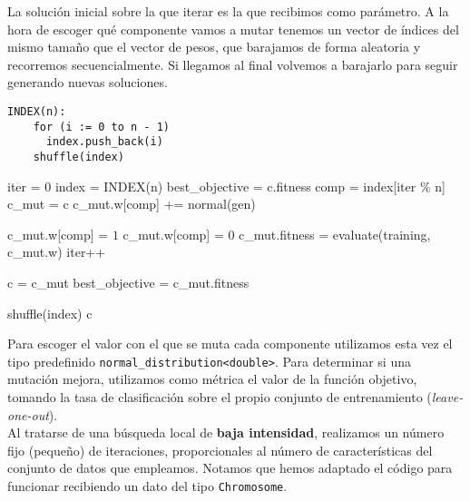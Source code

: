 \documentclass[12pt]{article}
\begin{document}
La solución inicial sobre la que iterar es la que recibimos como parámetro. A la hora de escoger qué componente vamos a mutar tenemos un vector de índices del mismo tamaño que el vector de pesos, que barajamos de forma aleatoria y recorremos secuencialmente. Si llegamos al final volvemos a barajarlo para seguir generando nuevas soluciones.

\begin{verbatim}
INDEX(n):
    for (i := 0 to n - 1)
      index.push_back(i)
    shuffle(index)
\end{verbatim}

\begin{algorithm}[h!]
\begin{algorithmic}

    \State iter = 0
    \State index = INDEX(n) 
    \State best\_objective = c.fitness
        \State comp = index[iter $\%$ n]
        \State c\_mut = c
        \State c\_mut.w[comp] += normal(gen)
        
         \State c\_mut.w[comp] = $1$
         \State c\_mut.w[comp] = $0$
        \EndIf
        \State c\_mut.fitness = evaluate(training, c\_mut.w)
        \State iter++

          \State c = c\_mut
          \State best\_objective = c\_mut.fitness
        \EndIf

          \State shuffle(index)
        \EndIf
     \EndWhile
\State \Return c
\EndFunction

\end{algorithmic}
\end{algorithm}

Para escoger el valor con el que se muta cada componente utilizamos esta vez el tipo predefinido \verb|normal_distribution<double>|. Para determinar si una mutación mejora, utilizamos como métrica el valor de la función objetivo, tomando la tasa de clasificación sobre el propio conjunto de entrenamiento (\textit{leave-one-out}).\\

Al tratarse de una búsqueda local de \textbf{baja intensidad}, realizamos un número fijo (pequeño) de iteraciones, proporcionales al número de características del conjunto de datos que empleamos. Notamos que hemos adaptado el código para funcionar recibiendo un dato del tipo \verb|Chromosome|.
\end{document}
